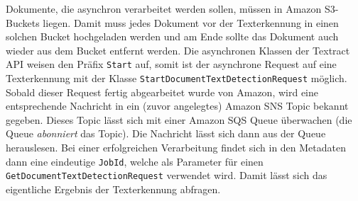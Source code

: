 \documentclass{whswinvcbook}
\begin{document}
Dokumente, die asynchron verarbeitet werden sollen, müssen in Amazon S3-Buckets liegen. Damit muss jedes Dokument vor der Texterkennung in einen solchen Bucket hochgeladen werden und am Ende sollte das Dokument auch wieder aus dem Bucket entfernt werden. Die asynchronen Klassen der Textract API weisen den Präfix \texttt{Start} auf, somit ist der asynchrone Request auf eine Texterkennung mit der Klasse \texttt{StartDocumentTextDetectionRequest} möglich. Sobald dieser Request fertig abgearbeitet wurde von Amazon, wird eine entsprechende Nachricht in ein (zuvor angelegtes) Amazon SNS Topic bekannt gegeben. Dieses Topic lässt sich mit einer Amazon SQS Queue überwachen (die Queue \textit{abonniert} das Topic). Die Nachricht lässt sich dann aus der Queue herauslesen. Bei einer erfolgreichen Verarbeitung findet sich in den Metadaten dann eine eindeutige \texttt{JobId}, welche als Parameter für einen \texttt{GetDocumentTextDetectionRequest} verwendet wird. Damit lässt sich das eigentliche Ergebnis der Texterkennung abfragen.
\end{document}
